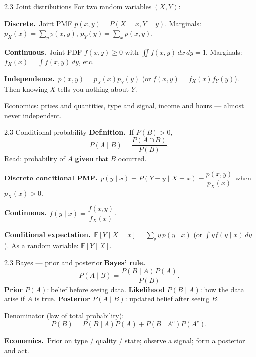 \documentclass[11pt,aspectratio=169]{beamer}
\begin{document}
\begin{frame}{2.3 Joint distributions}
  \footnotesize
  For two random variables $(X,Y)$:

  \medskip
  \textbf{Discrete.}\ Joint PMF $p(x,y)=P(X=x,Y=y)$.
  Marginals: $p_X(x)=\sum_y p(x,y)$, $p_Y(y)=\sum_x p(x,y)$.

  \medskip
  \textbf{Continuous.}\ Joint PDF $f(x,y)\ge 0$ with
  $\displaystyle\iint f(x,y)\,dx\,dy=1$.
  Marginals: $f_X(x)=\displaystyle\int f(x,y)\,dy$, etc.

  \medskip
  \textbf{Independence.}\
  $p(x,y)=p_X(x)p_Y(y)$ (or $f(x,y)=f_X(x)f_Y(y)$).
  Then knowing $X$ tells you nothing about $Y$.

  \medskip
  {\scriptsize Economics: prices and quantities, type and signal, income and hours ---
  almost never independent.}
\end{frame}

\begin{frame}{2.3 Conditional probability}
  \footnotesize
  \textbf{Definition.}\ If $P(B)>0$,
  \[
    P(A\mid B)=\frac{P(A\cap B)}{P(B)}.
  \]
  Read: probability of $A$ \textbf{given} that $B$ occurred.

  \medskip
  \textbf{Discrete conditional PMF.}\
  $p(y\mid x)=P(Y=y\mid X=x)=\dfrac{p(x,y)}{p_X(x)}$ when $p_X(x)>0$.

  \medskip
  \textbf{Continuous.}\
  $f(y\mid x)=\dfrac{f(x,y)}{f_X(x)}$.

  \medskip
  \textbf{Conditional expectation.}\
  $\mathbb{E}[Y\mid X=x]=\sum_y y\,p(y\mid x)$
  (or $\displaystyle\int y f(y\mid x)\,dy$).
  As a random variable: $\mathbb{E}[Y\mid X]$.
\end{frame}

\begin{frame}{2.3 Bayes --- prior and posterior}
  \footnotesize
  \textbf{Bayes' rule.}\
  \[
    P(A\mid B)
    =\frac{P(B\mid A)\,P(A)}{P(B)}.
  \]
  \textbf{Prior} $P(A)$: belief before seeing data.
  \textbf{Likelihood} $P(B\mid A)$: how the data arise if $A$ is true.
  \textbf{Posterior} $P(A\mid B)$: updated belief after seeing $B$.

  \medskip
  Denominator (law of total probability):
  \[
    P(B)=P(B\mid A)P(A)+P(B\mid A^c)P(A^c).
  \]

  \medskip
  \textbf{Economics.}\
  Prior on type / quality / state; observe a signal; form a posterior and act.
\end{frame}
\end{document}
